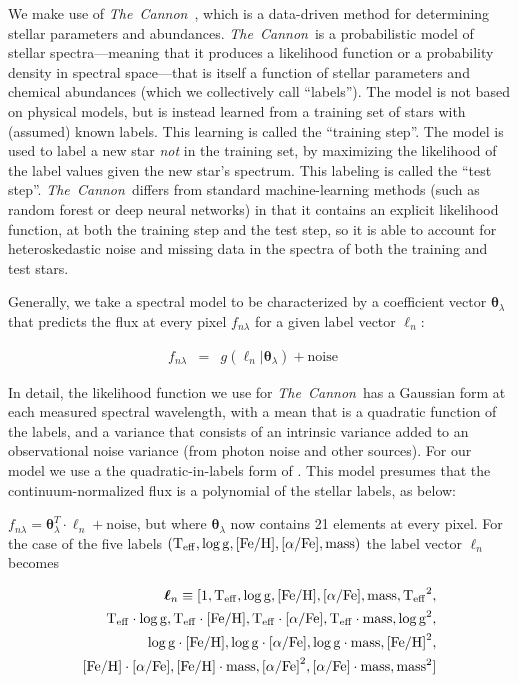 \documentclass[12pt, preprint]{aastex}
\newcommand{\project}[1]{\textsl{#1}}
\newcommand{\tc}{\project{The~Cannon}}
\newcommand{\teff}{\mbox{$\rm T_{eff}$}}
\newcommand{\feh}{\mbox{$\rm [Fe/H]$}}
\newcommand{\alphafe}{\mbox{$\rm [\alpha/Fe]$}}
\newcommand{\logg}{\mbox{$\rm \log g$}}
\newcommand{\set}[1]{\bm{#1}}
\newcommand{\starlabel}{\ell}
\newcommand{\starlabelvec}{\set{\starlabel}}
\begin{document}
We make use of \tc\ \citep{Ness2015}, which is a data-driven method for
determining stellar parameters and abundances.
\tc\ is a probabilistic model of stellar spectra---meaning that it
produces a likelihood function or a probability density in spectral
space---that is itself a function of stellar parameters and chemical
abundances (which we collectively call ``labels'').
The model is not based on physical models, but is instead learned
from a training set of stars with (assumed) known labels.
This learning is called the ``training step''.
The model is used to label a new star \emph{not} in the training set,
by maximizing the likelihood of the label values given the new star's
spectrum.
This labeling is called the ``test step''.
\tc\ differs from standard machine-learning methods
(such as random forest or deep neural networks) in that it contains an
explicit likelihood function, at both the training step and the test
step, so it is able to account for heteroskedastic noise and missing
data in the spectra of both the training and test stars.

Generally, we take a spectral model to be characterized by a coefficient vector $\set{\theta}_\lambda$
that predicts the flux at every pixel $f_{n\lambda}$ for a given label vector $\starlabelvec_n$:


\begin{eqnarray}
f_{n\lambda} &=&
g(\starlabelvec_n |  \set{\theta}_\lambda) + \mbox{noise}
\label{eq:specmodel}\quad 
\end{eqnarray}

In detail, the likelihood function we use for \tc\ has a
Gaussian form at each measured spectral wavelength, with a mean that
is a quadratic function of the labels, and a variance that consists of
an intrinsic variance added to an observational noise variance (from
photon noise and other sources). For our model we use a the quadratic-in-labels form of \citet{Ness2015}. This model presumes that the continuum-normalized flux is a polynomial of the stellar labels, as below: 

$f_{n\lambda} =
\set{\theta}_\lambda^T \cdot \starlabelvec_n + \mbox{noise}$, 
but where $\set{\theta}_\lambda$ now contains 21 elements at every pixel. For the case of the five labels $(\teff , \logg , \feh, \alphafe, \mbox{mass})$ the label vector $\starlabelvec_n$
becomes  

\begin{equation}
\begin{split}
\starlabelvec_n \equiv  [1, \teff, \logg, \feh, \alphafe, \mbox{mass}, \teff^2, \\
 \teff\cdot\logg, \teff\cdot\feh, \teff\cdot\alphafe, \teff\cdot \mbox{mass},  \logg^2, \\
  \logg\cdot\feh, \logg\cdot\alphafe, \logg\cdot \mbox{mass}, \feh^2, \\
  \feh\cdot\alphafe, \feh\cdot \mbox{mass}, \alphafe^2, \alphafe\cdot \mbox{mass}, \mbox{mass}^2]
\end{split}
 \label{eq:quad}
\end{equation}
\end{document}
